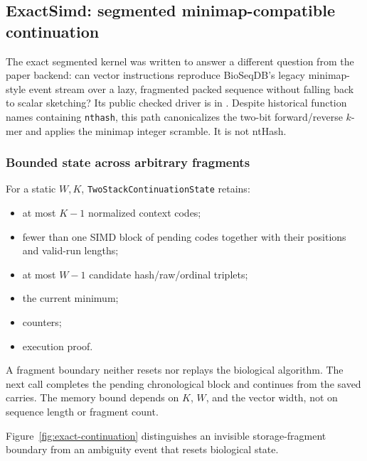 \subsection{ExactSimd: segmented minimap-compatible continuation}
\label{sec:exact-simd}

The exact segmented kernel was written to answer a different question from
the paper backend: can vector instructions reproduce BioSeqDB's legacy
minimap-style event stream over a lazy, fragmented packed sequence without
falling back to scalar sketching?  Its public checked driver is in
.
Despite historical function names containing \texttt{nthash}, this path
canonicalizes the two-bit forward/reverse $k$-mer and applies the minimap
integer scramble.  It is not ntHash.

\subsubsection{Bounded state across arbitrary fragments}

For a static $W,K$, \texttt{TwoStackContinuationState} retains:
\begin{itemize}
  \item at most $K-1$ normalized context codes;
  \item fewer than one SIMD block of pending codes together with their
    positions and valid-run lengths;
  \item at most $W-1$ candidate hash/raw/ordinal triplets;
  \item the current minimum;
  \item counters;
  \item execution proof.
\end{itemize}
A fragment boundary neither resets nor replays the biological algorithm.  The
next call completes the pending chronological block and continues from the
saved carries.  The memory bound depends on $K$, $W$, and the vector width,
not on sequence length or fragment count.

Figure~\ref{fig:exact-continuation} distinguishes an invisible storage-fragment
boundary from an ambiguity event that resets biological state.

